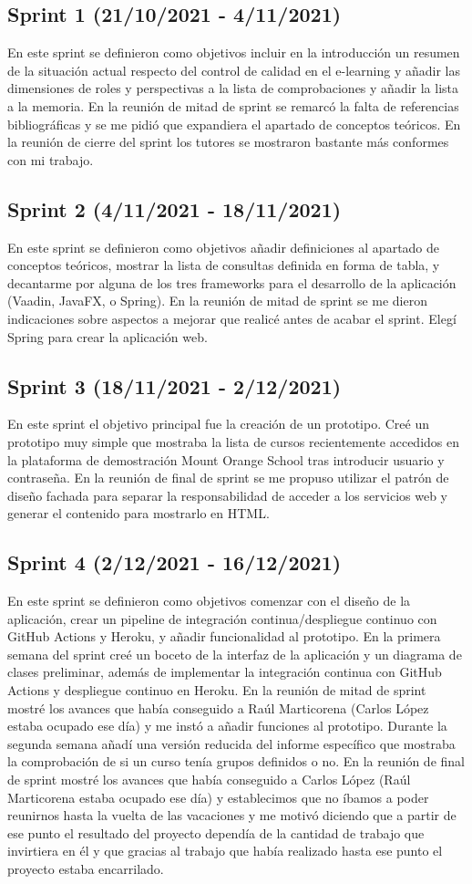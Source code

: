 \subsection{Sprint 1 (21/10/2021 - 4/11/2021)}
	En este sprint se definieron como objetivos incluir en la introducción un resumen de la situación actual respecto del control de calidad en el e-learning y añadir las dimensiones de roles y perspectivas a la lista de comprobaciones y añadir la lista a la memoria. En la reunión de mitad de sprint se remarcó la falta de referencias bibliográficas y se me pidió que expandiera el apartado de conceptos teóricos. En la reunión de cierre del sprint los tutores se mostraron bastante más conformes con mi trabajo.
\subsection{Sprint 2 (4/11/2021 - 18/11/2021)}
	En este sprint se definieron como objetivos añadir definiciones al apartado de conceptos teóricos, mostrar la lista de consultas definida en forma de tabla, y decantarme por alguna de los tres frameworks para el desarrollo de la aplicación (Vaadin, JavaFX, o Spring). En la reunión de mitad de sprint se me dieron indicaciones sobre aspectos a mejorar que realicé antes de acabar el sprint. Elegí Spring para crear la aplicación web.
\subsection{Sprint 3 (18/11/2021 - 2/12/2021)}
	En este sprint el objetivo principal fue la creación de un prototipo. Creé un prototipo muy simple que mostraba la lista de cursos recientemente accedidos en la plataforma de demostración Mount Orange School tras introducir usuario y contraseña. En la reunión de final de sprint se me propuso utilizar el patrón de diseño fachada para separar la responsabilidad de acceder a los servicios web y generar el contenido para mostrarlo en HTML.
\subsection{Sprint 4 (2/12/2021 - 16/12/2021)}
	En este sprint se definieron como objetivos comenzar con el diseño de la aplicación, crear un pipeline de integración continua/despliegue continuo con GitHub Actions y Heroku, y añadir funcionalidad al prototipo. En la primera semana del sprint creé un boceto de la interfaz de la aplicación y un diagrama de clases preliminar, además de implementar la integración continua con GitHub Actions y despliegue continuo en Heroku. En la reunión de mitad de sprint mostré los avances que había conseguido a Raúl Marticorena (Carlos López estaba ocupado ese día) y me instó a añadir funciones al prototipo. Durante la segunda semana añadí una versión reducida del informe específico que mostraba la comprobación de si un curso tenía grupos definidos o no. En la reunión de final de sprint mostré los avances que había conseguido a Carlos López (Raúl Marticorena estaba ocupado ese día) y establecimos que no íbamos a poder reunirnos hasta la vuelta de las vacaciones y me motivó diciendo que a partir de ese punto el resultado del proyecto dependía de la cantidad de trabajo que invirtiera en él y que gracias al trabajo que había realizado hasta ese punto el proyecto estaba encarrilado.
